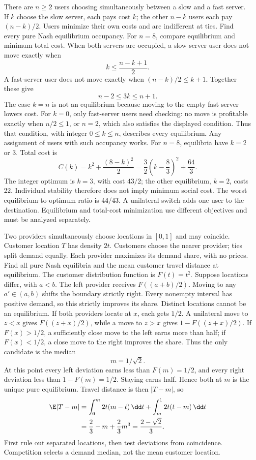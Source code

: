 There are $n\ge2$ users choosing simultaneously between a slow and a fast server. If $k$ choose the slow server, each pays cost $k$; the other $n-k$ users each pay $(n-k)/2$. Users minimize their own costs and are indifferent at ties. Find every pure Nash equilibrium occupancy. For $n=8$, compare equilibrium and minimum total cost.
\solution When both servers are occupied, a slow-server user does not move exactly when
\[
 k\le\frac{n-k+1}{2}.
\]
A fast-server user does not move exactly when $(n-k)/2\le k+1$. Together these give
\[
 \boxed{n-2\le3k\le n+1}.
\]
The case $k=n$ is not an equilibrium because moving to the empty fast server lowers cost. For $k=0$, only fast-server users need checking: no move is profitable exactly when $n/2\le1$, or $n=2$, which also satisfies the displayed condition. Thus that condition, with integer $0\le k\le n$, describes every equilibrium. Any assignment of users with such occupancy works.
For $n=8$, equilibria have $k=2$ or $3$. Total cost is
\[
 C(k)=k^2+\frac{(8-k)^2}{2}
 =\frac32\left(k-\frac83\right)^2+\frac{64}{3}.
\]
The integer optimum is $k=3$, with cost $43/2$; the other equilibrium, $k=2$, costs $22$. Individual stability therefore does not imply minimum social cost. The worst equilibrium-to-optimum ratio is $44/43$.
\insight A unilateral switch adds one user to the destination. Equilibrium and total-cost minimization use different objectives and must be analyzed separately.

Two providers simultaneously choose locations in $[0,1]$ and may coincide. Customer location $T$ has density $2t$. Customers choose the nearer provider; ties split demand equally. Each provider maximizes its demand share, with no prices. Find all pure Nash equilibria and the mean customer travel distance at equilibrium.
\solution The customer distribution function is $F(t)=t^2$. Suppose locations differ, with $a<b$. The left provider receives $F((a+b)/2)$. Moving to any $a'\in(a,b)$ shifts the boundary strictly right. Every nonempty interval has positive demand, so this strictly improves its share. Distinct locations cannot be an equilibrium.
If both providers locate at $x$, each gets $1/2$. A unilateral move to $z<x$ gives $F((z+x)/2)$, while a move to $z>x$ gives $1-F((z+x)/2)$. If $F(x)>1/2$, a sufficiently close move to the left earns more than half; if $F(x)<1/2$, a close move to the right improves the share. Thus the only candidate is the median
\[
 m=1/\sqrt2.
\]
At this point every left deviation earns less than $F(m)=1/2$, and every right deviation less than $1-F(m)=1/2$. Staying earns half. Hence both at $m$ is the unique pure equilibrium.
Travel distance is then $|T-m|$, so
\[
 \begin{aligned}
 \E|T-m|&=\int_0^m2t(m-t)\,\dd t
       +\int_m^12t(t-m)\,\dd t\\
 &=\frac23-m+\frac23m^3=\frac{2-\sqrt2}{3}.
 \end{aligned}
\]
\insight First rule out separated locations, then test deviations from coincidence. Competition selects a demand median, not the mean customer location.

